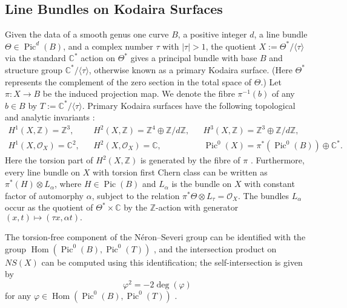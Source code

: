 \documentclass{article}[12pt]
\theoremstyle{definition}
\theoremstyle{remark}
\newcommand \Z{\mathbb Z}
\newcommand \C{\mathbb C}
\newcommand \vp{\varphi}
\numberwithin{equation}{section}
\newcommand \mc{\mathcal}
\DeclareMathOperator{\Hom}{Hom}
\DeclareMathOperator{\Pic}{Pic}
\begin{document}
\subsection{Line Bundles on Kodaira Surfaces}
Given the data of a smooth genus one curve $B$, a positive integer $d$, a line bundle $\Theta \in \Pic^d(B)$, and a complex number $\tau$ with $|\tau|>1$, the quotient $X:=\Theta^*/\langle \tau\rangle$ via the standard $\C^*$ action on $\Theta^*$ gives a principal bundle with base $B$ and structure group $\C^*/\langle \tau\rangle$, otherwise known as a primary Kodaira surface. (Here $\Theta^*$ represents the complement of the zero section in the total space of $\Theta$.)
Let $\pi:X \to B$ be the induced projection map. We denote the fibre $\pi^{-1}(b)$ of any $b \in B$ by $T:=\C^*/\langle\tau\rangle$. Primary Kodaira surfaces have the following topological and analytic invariants \cite{barth2003compact}:
\begin{align*}
	H^1(X,\Z)=\Z^3, && H^2(X,\Z)=\Z^4\oplus \Z/d\Z, && H^3(X,\Z)=\Z^3\oplus \Z/d\Z,\\
	H^1(X,\mc{O}_X)=\C^2, && H^2(X,\mc{O}_X)=\C, && \Pic^0(X)=\pi^*(\Pic^0(B))\oplus \C^*. 
\end{align*}
Here the torsion part of $H^2(X,\Z)$ is generated by the fibre of $\pi$ \cite{Teleman}. Furthermore, every line bundle on $X$ with torsion first Chern class can be written as $\pi^*(H)\otimes L_\alpha$, where $H \in \Pic(B)$ and $L_\alpha$ is the bundle on $X$ with constant factor of automorphy $\alpha$, subject to the relation $\pi^*\Theta \otimes L_\tau=\mc{O}_X$. The bundles $L_\alpha$ occur as the quotient of $\Theta^*\times \C$ by the $\Z$-action with generator $(x,t)\mapsto (\tau x, \alpha t).$

The torsion-free component of the N\'eron--Severi group can be identified with the group \linebreak $\Hom(\Pic^0(B), \Pic^0(T))$ \cite{Brin}, and the intersection product on $NS(X)$ can be computed using this identification;  the self-intersection is given by $$\vp^2=-2\deg(\vp)$$ for any $\vp \in \Hom(\Pic^0(B), \Pic^0(T))$ \cite[Theorem 1.10, Remark 1.11]{Teleman}.
\end{document}
